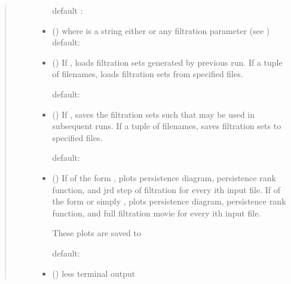 \documentclass[letterpaper,10pt,openany,oneside,english]{sphinxmanual}
\begin{document}
\begin{fulllineitems}
\begin{quote}
\begin{description}
\begin{itemize}
default : 


\item {} 
 (\sphinxstyleliteralemphasis{, }) \textendash{}  where  is a string \textendash{} either
 or any filtration parameter
(see )
default: 

\item {} 
 (\sphinxstyleliteralemphasis{, }) \textendash{} 
If , loads filtration sets generated by previous run. If a
tuple of filenames, loads filtration sets from specified files.

default: 


\item {} 
 (\sphinxstyleliteralemphasis{, }) \textendash{} 
If , saves the filtration sets such that 
may     be used in subsequent runs. If a tuple of filenames, saves
filtration sets to specified files.

default: 


\item {} 
 (\sphinxstyleliteralemphasis{, }) \textendash{} 
If of the form , plots persistence
diagram, persistence rank function, and jrd step of filtration for
every ith input file. If of the form  or simply
, plots persistence diagram, persistence rank function, and full
filtration movie for every ith input file.

These plots are saved to 

default: 


\item {} 
 (\sphinxstyleliteralemphasis{, }) \textendash{} 
less terminal output


\end{itemize}
\end{description}
\end{quote}
\end{fulllineitems}
\end{document}
